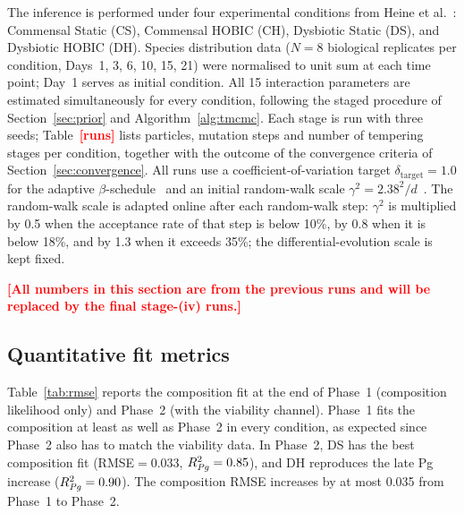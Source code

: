 \documentclass[11pt,a4paper]{article}
\newcommand{\TBD}[1]{\textcolor{red}{\textbf{[#1]}}}
\begin{document}
The inference is performed under four experimental conditions from Heine et al.~\cite{heine2025influence}: Commensal Static (CS), Commensal HOBIC (CH), Dysbiotic Static (DS), and Dysbiotic HOBIC (DH).
Species distribution data ($N=8$ biological replicates per condition, Days~1, 3, 6, 10, 15, 21) were normalised to unit sum at each time point; Day~1 serves as initial condition.
All 15 interaction parameters are estimated simultaneously for every condition, following the staged procedure of Section~\ref{sec:prior} and Algorithm~\ref{alg:tmcmc}.
Each stage is run with three seeds; Table~\TBD{runs} lists particles, mutation steps and number of tempering stages per condition, together with the outcome of the convergence criteria of Section~\ref{sec:convergence}.
All runs use a coefficient-of-variation target $\delta_{\mathrm{target}}=1.0$ for the adaptive $\beta$-schedule~\cite{Betz2016TMCMC} and an initial random-walk scale $\gamma^2=2.38^2/d$~\cite{RobertsRosenthal2001Optimal}.
The random-walk scale is adapted online after each random-walk step: $\gamma^2$ is multiplied by 0.5 when the acceptance rate of that step is below 10\%, by 0.8 when it is below 18\%, and by 1.3 when it exceeds 35\%; the differential-evolution scale is kept fixed.

\TBD{All numbers in this section are from the previous runs and will be replaced by the final stage-(iv) runs.}

\subsection{Quantitative fit metrics}

Table~\ref{tab:rmse} reports the composition fit at the end of Phase~1 (composition likelihood only) and Phase~2 (with the viability channel).
Phase~1 fits the composition at least as well as Phase~2 in every condition, as expected since Phase~2 also has to match the viability data.
In Phase~2, DS has the best composition fit (RMSE$=$0.033, $R^2_{\text{\textit{Pg}}}=0.85$), and DH reproduces the late Pg increase ($R^2_{\text{\textit{Pg}}}=0.90$).
The composition RMSE increases by at most 0.035 from Phase~1 to Phase~2.
\end{document}

